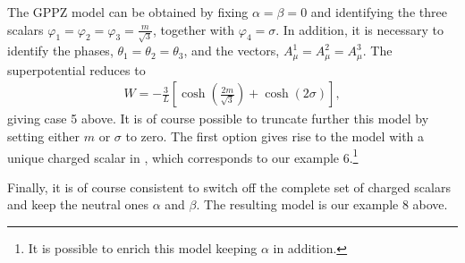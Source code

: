 The GPPZ model \cite{Girardello:1999bd} can be obtained by fixing $\alpha=\beta=0$ and identifying the three scalars $\varphi_1=\varphi_2=\varphi_3=\frac{m}{\sqrt{3}}$, together with $\varphi_4=\sigma$.
In addition, it is necessary to identify the phases, $\theta_1=\theta_2=\theta_3$, and the vectors, $A_\mu^1=A_\mu^2=A_\mu^3$.
The superpotential reduces to
\begin{align}
W=-\frac{3}{L}\left[\cosh\left(\frac{2m}{\sqrt{3}}\right)+\cosh(2\sigma)\right],
\end{align}
giving case 5 above.
It is of course possible to truncate further this model by setting either $m$ or $\sigma$ to zero.
The first option gives rise to the model with a unique charged scalar in \cite{Gubser:2009qm}, which corresponds to our example 6.\footnote{It is possible to enrich this model keeping $\alpha$ in addition.}

Finally, it is of course consistent to switch off the complete set of charged scalars and keep the neutral ones $\alpha$ and $\beta$.
The resulting model is our example 8 above.

